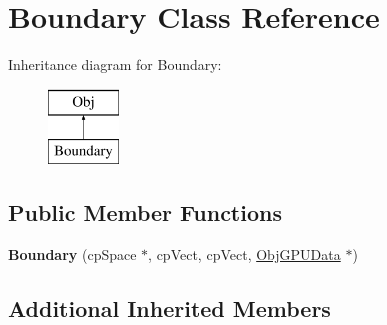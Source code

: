 \hypertarget{class_boundary}{}\section{Boundary Class Reference}
\label{class_boundary}
Inheritance diagram for Boundary\+:\begin{figure}[H]
\begin{center}
\leavevmode
\includegraphics[height=2.000000cm]{class_boundary}
\end{center}
\end{figure}
\subsection*{Public Member Functions}
\begin{DoxyCompactItemize}
\item 
{\bfseries Boundary} (cp\+Space $\ast$, cp\+Vect, cp\+Vect, \hyperlink{class_obj_g_p_u_data}{Obj\+G\+P\+U\+Data} $\ast$)\hypertarget{class_boundary_a0f3c061061b9dc6780b1f90b7318e6aa}{}\label{class_boundary_a0f3c061061b9dc6780b1f90b7318e6aa}

\end{DoxyCompactItemize}
\subsection*{Additional Inherited Members}
